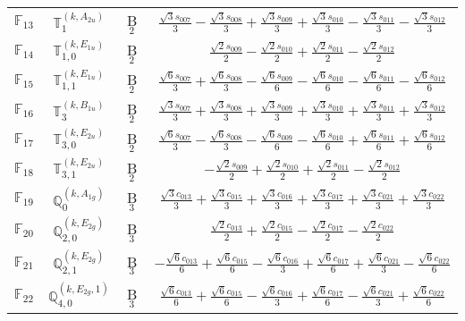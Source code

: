 \documentclass[fleqn,10pt,landscape]{article}
\begin{document}
\begin{itemize}
\begin{center}
\begin{longtable}{c|c|c|c}
$ \mathbb{F}_{13} $ & $\mathbb{T}_{1}^{(k,A_{2u})}$ & B$_{2}$ & $\frac{\sqrt{3} s_{007}}{3} - \frac{\sqrt{3} s_{008}}{3} + \frac{\sqrt{3} s_{009}}{3} + \frac{\sqrt{3} s_{010}}{3} - \frac{\sqrt{3} s_{011}}{3} - \frac{\sqrt{3} s_{012}}{3}$ \\
$ \mathbb{F}_{14} $ & $\mathbb{T}_{1,0}^{(k,E_{1u})}$ & B$_{2}$ & $\frac{\sqrt{2} s_{009}}{2} - \frac{\sqrt{2} s_{010}}{2} + \frac{\sqrt{2} s_{011}}{2} - \frac{\sqrt{2} s_{012}}{2}$ \\
$ \mathbb{F}_{15} $ & $\mathbb{T}_{1,1}^{(k,E_{1u})}$ & B$_{2}$ & $\frac{\sqrt{6} s_{007}}{3} + \frac{\sqrt{6} s_{008}}{3} - \frac{\sqrt{6} s_{009}}{6} - \frac{\sqrt{6} s_{010}}{6} - \frac{\sqrt{6} s_{011}}{6} - \frac{\sqrt{6} s_{012}}{6}$ \\
$ \mathbb{F}_{16} $ & $\mathbb{T}_{3}^{(k,B_{1u})}$ & B$_{2}$ & $\frac{\sqrt{3} s_{007}}{3} + \frac{\sqrt{3} s_{008}}{3} + \frac{\sqrt{3} s_{009}}{3} + \frac{\sqrt{3} s_{010}}{3} + \frac{\sqrt{3} s_{011}}{3} + \frac{\sqrt{3} s_{012}}{3}$ \\
$ \mathbb{F}_{17} $ & $\mathbb{T}_{3,0}^{(k,E_{2u})}$ & B$_{2}$ & $\frac{\sqrt{6} s_{007}}{3} - \frac{\sqrt{6} s_{008}}{3} - \frac{\sqrt{6} s_{009}}{6} - \frac{\sqrt{6} s_{010}}{6} + \frac{\sqrt{6} s_{011}}{6} + \frac{\sqrt{6} s_{012}}{6}$ \\
$ \mathbb{F}_{18} $ & $\mathbb{T}_{3,1}^{(k,E_{2u})}$ & B$_{2}$ & $- \frac{\sqrt{2} s_{009}}{2} + \frac{\sqrt{2} s_{010}}{2} + \frac{\sqrt{2} s_{011}}{2} - \frac{\sqrt{2} s_{012}}{2}$ \\ \hline
$ \mathbb{F}_{19} $ & $\mathbb{Q}_{0}^{(k,A_{1g})}$ & B$_{3}$ & $\frac{\sqrt{3} c_{013}}{3} + \frac{\sqrt{3} c_{015}}{3} + \frac{\sqrt{3} c_{016}}{3} + \frac{\sqrt{3} c_{017}}{3} + \frac{\sqrt{3} c_{021}}{3} + \frac{\sqrt{3} c_{022}}{3}$ \\
$ \mathbb{F}_{20} $ & $\mathbb{Q}_{2,0}^{(k,E_{2g})}$ & B$_{3}$ & $\frac{\sqrt{2} c_{013}}{2} + \frac{\sqrt{2} c_{015}}{2} - \frac{\sqrt{2} c_{017}}{2} - \frac{\sqrt{2} c_{022}}{2}$ \\
$ \mathbb{F}_{21} $ & $\mathbb{Q}_{2,1}^{(k,E_{2g})}$ & B$_{3}$ & $- \frac{\sqrt{6} c_{013}}{6} + \frac{\sqrt{6} c_{015}}{6} - \frac{\sqrt{6} c_{016}}{3} + \frac{\sqrt{6} c_{017}}{6} + \frac{\sqrt{6} c_{021}}{3} - \frac{\sqrt{6} c_{022}}{6}$ \\
$ \mathbb{F}_{22} $ & $\mathbb{Q}_{4,0}^{(k,E_{2g},1)}$ & B$_{3}$ & $\frac{\sqrt{6} c_{013}}{6} + \frac{\sqrt{6} c_{015}}{6} - \frac{\sqrt{6} c_{016}}{3} + \frac{\sqrt{6} c_{017}}{6} - \frac{\sqrt{6} c_{021}}{3} + \frac{\sqrt{6} c_{022}}{6}$ \\

\end{longtable}
\end{center}
\end{itemize}
\end{document}
